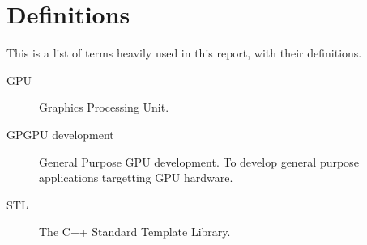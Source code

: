 \section*{Definitions}
This is a list of terms heavily used in this report, with their definitions.

\begin{description}
\item[GPU] Graphics Processing Unit.
\item[GPGPU development] General Purpose GPU development. To develop general purpose applications targetting GPU hardware.
\item[STL] The C++ Standard Template Library.
\end{description}
